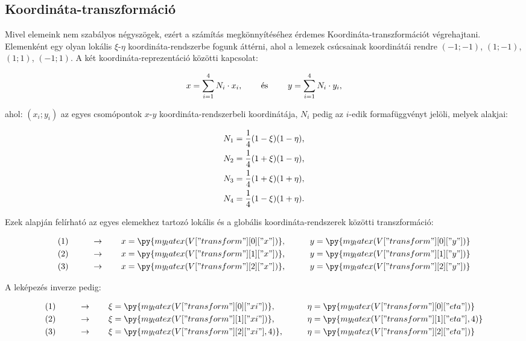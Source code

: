 \subsection{Koordináta-transzformáció}

Mivel elemeink nem szabályos négyszögek, ezért a számítás megkönnyítéséhez
érdemes Koordináta-transzformációt végrehajtani. Elemenként egy olyan lokális
$\xi$-$\eta$ koordináta-rendszerbe fogunk áttérni, ahol a lemezek csúcsainak
koordinátái rendre $(-1;-1)$, $(1;-1)$, $(1;1)$, $(-1;1)$. A két
koordináta-reprezentáció közötti kapcsolat:
\begin{myframe}
  \begin{equation}
    x = \sum_{i=1}^4 N_i \cdot x_i
    \text,
    \qquad
    \text{ és }
    \qquad
    y = \sum_{i=1}^4 N_i \cdot y_i
    \text,
  \end{equation}
\end{myframe}
ahol: $(x_i; y_i)$ az egyes csomópontok $x$-$y$ koordináta-rendszerbeli
koordinátája, $N_i$ pedig az $i$-edik formafüggvényt jelöli, melyek alakjai:
\begin{myframe}
  \begin{gather}
    N_1 = \frac{1}{4} (1 - \xi) (1 - \eta) \text, \\
    N_2 = \frac{1}{4} (1 + \xi) (1 - \eta) \text, \\
    N_3 = \frac{1}{4} (1 + \xi) (1 + \eta) \text, \\
    N_4 = \frac{1}{4} (1 - \xi) (1 + \eta) \text.
  \end{gather}
\end{myframe}
Ezek alapján felírható az egyes elemekhez tartozó lokális és a globális
koordináta-rendszerek közötti transzformáció:
\begin{myframe}
  \begin{alignat}{9}
     & (1) \qquad & \rightarrow \qquad x & = \py{my_latex(V["transform"][0]["x"])} \text, &  & \qquad y = \py{my_latex(V["transform"][0]["y"])}
    \\
     & (2) \qquad & \rightarrow \qquad x & = \py{my_latex(V["transform"][1]["x"])} \text, &  & \qquad y = \py{my_latex(V["transform"][1]["y"])}
    \\
     & (3) \qquad & \rightarrow \qquad x & = \py{my_latex(V["transform"][2]["x"])} \text, &  & \qquad y = \py{my_latex(V["transform"][2]["y"])}
  \end{alignat}
\end{myframe}
A leképezés inverze pedig:
\begin{myframe}
  \begin{alignat}{9}
     & (1) \qquad & \rightarrow \qquad \xi & = \py{my_latex(V["transform"][0]["xi"])} \text,    &  & \qquad \eta = \py{my_latex(V["transform"][0]["eta"])}
    \\
     & (2) \qquad & \rightarrow \qquad \xi & = \py{my_latex(V["transform"][1]["xi"])} \text,    &  & \qquad \eta = \py{my_latex(V["transform"][1]["eta"], 4)}
    \label{eq:alma}
    \\
     & (3) \qquad & \rightarrow \qquad \xi & = \py{my_latex(V["transform"][2]["xi"], 4)} \text, &  & \qquad \eta = \py{my_latex(V["transform"][2]["eta"])}
  \end{alignat}
\end{myframe}

